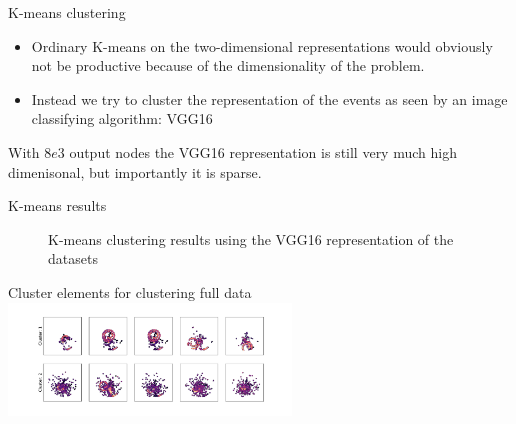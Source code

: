 \documentclass{beamer}
\begin{document}
\begin{frame}[t]{K-means clustering}
	\begin{itemize}
		\item Ordinary K-means on the two-dimensional representations would obviously not be productive because of the dimensionality of the problem.
		\item Instead we try to cluster the representation of the events as seen by an image classifying algorithm: VGG16
	\end{itemize}

	With $8e3$ output nodes the VGG16 representation is still very much high dimenisonal, but importantly it is sparse.
\end{frame}

\begin{frame}[t]{K-means results}
	\begin{figure}[h]
		\centering 
		\caption{K-means clustering results using the VGG16 representation of the datasets}
	\end{figure}
	Cluster elements for clustering full data 
	\centering 
	\includegraphics[height=3cm]{../chapters/results/clustering/plots/full_vgg_cluster_repr.pdf}
\end{frame}
\end{document}

